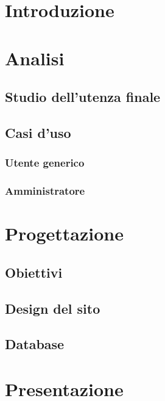 \documentclass[a4paper, oneside, openany, dvipsnames, table]{article}
\begin{document}
\copertina
\tableofcontents
\newpage
\section{Introduzione}
	
\newpage
\section{Analisi}
	
	\subsection{Studio dell'utenza finale}
		
	\subsection{Casi d'uso}
		
		\subsubsection{Utente generico}
			
		\subsubsection{Amministratore}
			
\newpage
\section{Progettazione}
	
	\subsection{Obiettivi}
		
	\subsection{Design del sito}
		
	\subsection{Database}
		
\newpage
\section{Presentazione}
	
\newpage
\end{document}
